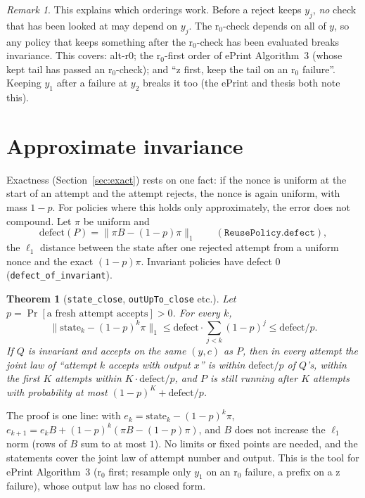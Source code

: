 \documentclass[11pt]{article}
\newtheorem{theorem}{Theorem}
\theoremstyle{definition}
\theoremstyle{remark}
\newtheorem*{remark}{Remark}
\newcommand{\lean}[1]{\texttt{#1}}
\renewcommand{\Pr}{\mathop{\mathrm{Pr}}}
\begin{document}
\begin{remark}
This explains which orderings work. Before a reject keeps $y_j$, \emph{no} check that has been
looked at may depend on $y_j$. The r$_0$-check depends on all of $y$, so any policy that keeps
something after the r$_0$-check has been evaluated breaks invariance. This covers: alt-r0; the
r$_0$-first order of ePrint Algorithm~3 (whose kept tail has passed an r$_0$-check); and
``z first, keep the tail on an r$_0$ failure''. Keeping $y_1$ after a failure at $y_2$ breaks it
too (the ePrint and thesis both note this).
\end{remark}

\section{Approximate invariance}\label{sec:approx}

Exactness (Section~\ref{sec:exact}) rests on one fact: if the nonce is uniform at the start of an
attempt and the attempt rejects, the nonce is again uniform, with mass $1-p$. For policies where
this holds only approximately, the error does not compound. Let $\pi$ be uniform and
\[
  \mathrm{defect}(P) = \big\|\pi B - (1-p)\pi\big\|_1
  \qquad(\lean{ReusePolicy.defect}),
\]
the $\ell_1$ distance between the state after one rejected attempt from a uniform nonce and the
exact $(1-p)\pi$. Invariant policies have defect $0$ (\lean{defect\_of\_invariant}).

\begin{theorem}[\lean{state\_close}, \lean{outUpTo\_close} etc.]
Let $p = \Pr[\text{a fresh attempt accepts}] > 0$. For every $k$,
\[
  \big\|\mathrm{state}_k - (1-p)^k\pi\big\|_1 \le \mathrm{defect}\cdot\sum_{j<k}(1-p)^j
  \le \mathrm{defect}/p.
\]
If $Q$ is invariant and accepts on the same $(y,c)$ as $P$, then in every attempt the joint law
of ``attempt $k$ accepts with output $x$'' is within $\mathrm{defect}/p$ of $Q$'s, within the first
$K$ attempts within $K\cdot\mathrm{defect}/p$, and $P$ is still running after $K$ attempts with
probability at most $(1-p)^K + \mathrm{defect}/p$.
\end{theorem}

The proof is one line: with $e_k = \mathrm{state}_k - (1-p)^k\pi$,
$e_{k+1} = e_k B + (1-p)^k(\pi B - (1-p)\pi)$, and $B$ does not increase the $\ell_1$ norm
(rows of $B$ sum to at most $1$). No limits or fixed points are needed, and the statements cover
the joint law of attempt number and output. This is the tool for ePrint Algorithm~3
(r$_0$ first; resample only $y_1$ on an r$_0$ failure, a prefix on a z failure), whose output law
has no closed form.
\end{document}
